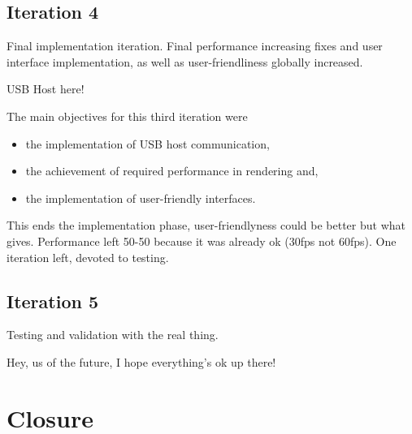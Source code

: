 		\subsection{Iteration 4}
			Final implementation iteration. Final performance increasing fixes and user interface implementation, as well as user-friendliness globally increased.

			USB Host here!

			The main objectives for this third iteration were
			\begin{itemize} 
				\item the implementation of USB host communication,
				\item the achievement of required performance in rendering and, 
				\item the implementation of user-friendly interfaces.
			\end{itemize}

			This ends the implementation phase, user-friendlyness could be better but what gives. 
			Performance left 50-50 because it was already ok (30fps not 60fps).
			One iteration left, devoted to testing.

		\subsection{Iteration 5}
			Testing and validation with the real thing.

			Hey, us of the future, I hope everything's ok up there!
			
	\section{Closure}
